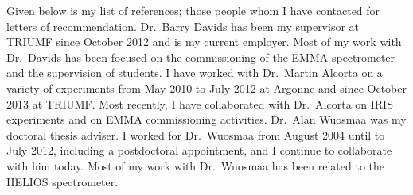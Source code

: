 \renewcommand{\doctitle}{\shortname~\refsname}
\hypersetup{pdftitle=\doctitle}
 {
Given below is my list of references; those people whom I have contacted for letters of recommendation.
Dr.\ Barry Davids has been my supervisor at TRIUMF since October 2012 and is my current employer. Most of my work with 
 Dr.\ Davids has been focused on the %
 commissioning of the EMMA spectrometer and the supervision of students.
I have worked with Dr.\ Martin Alcorta on a variety of experiments from May 2010 to July 2012 at Argonne and since October 2013 at TRIUMF. Most recently, I have collaborated with Dr.\ Alcorta on IRIS experiments and on EMMA commissioning activities.
Dr.\ Alan Wuosmaa was my doctoral thesis adviser. I worked for Dr.\ Wuosmaa from August 2004 until to July 2012, including a postdoctoral appointment, and I continue to collaborate with him today.  Most of my work with Dr.\ Wuosmaa has been related to the HELIOS spectrometer.
\cfoot{}
}
\vspace{2.0\baselineskip}%
